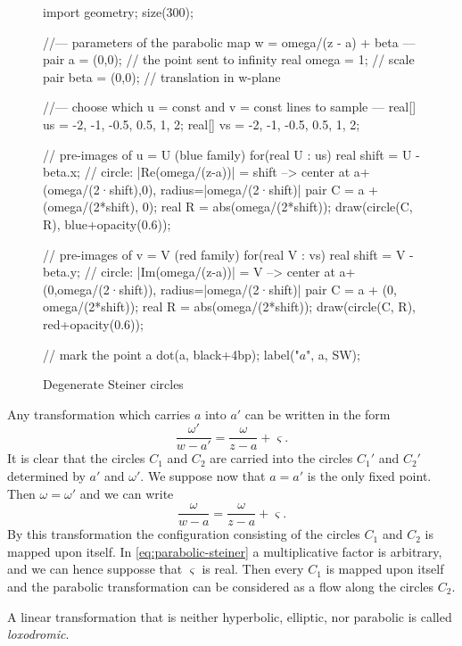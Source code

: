 \begin{figure}[h]
	\label{fig:degenerate-steiner}
	\caption{Degenerate Steiner circles}
	\centering
	\begin{asy}[width=10cm]
		import geometry;
		size(300);

		//--- parameters of the parabolic map w = omega/(z - a) + beta ---
		pair a    = (0,0);    // the point sent to infinity
		real omega = 1;       // scale
		pair beta = (0,0);    // translation in w-plane

		//--- choose which u = const and v = const lines to sample ---
		real[] us = {-2, -1, -0.5, 0.5, 1, 2};
		real[] vs = {-2, -1, -0.5, 0.5, 1, 2};

		// pre-images of u = U  (blue family)
		for(real U : us) {
		real shift = U - beta.x;
		// circle: |Re(omega/(z-a))| = shift  --> center at a+(omega/(2·shift),0), radius=|omega/(2·shift)|
		pair C = a + (omega/(2*shift), 0);
		real R = abs(omega/(2*shift));
		draw(circle(C, R), blue+opacity(0.6));
		}

		// pre-images of v = V  (red family)
		for(real V : vs) {
		real shift = V - beta.y;
		// circle: |Im(omega/(z-a))| = V  --> center at a+(0,omega/(2·shift)), radius=|omega/(2·shift)|
		pair C = a + (0, omega/(2*shift));
		real R = abs(omega/(2*shift));
		draw(circle(C, R), red+opacity(0.6));
		}

		// mark the point a
		dot(a, black+4bp);
		label("$a$", a, SW);
	\end{asy}
\end{figure}

Any transformation which carries $a$ into $a'$ can be written in the form $$\dfrac{\omega'}{w-a'}=\dfrac{\omega}{z-a}+\varsigma.$$ It is clear that the circles $C_1$ and $C_2$ are carried into the circles $C_1'$ and $C_2'$ determined by $a'$ and $\omega'$. We suppose now that $a=a'$ is the only fixed point. Then $\omega=\omega'$ and we can write
\begin{equation}
	\label{eq:parabolic-steiner}
	\dfrac{\omega}{w-a}=\dfrac{\omega}{z-a}+\varsigma.
\end{equation}
By this transformation the configuration consisting of the circles $C_1$ and $C_2$ is mapped upon itself. In \ref{eq:parabolic-steiner} a multiplicative factor is arbitrary, and we can hence supposse that $\varsigma$ is real. Then every $C_1$ is mapped upon itself and the parabolic transformation can be considered as a flow along the circles $C_2$.

A linear transformation that is neither hyperbolic, elliptic, nor parabolic is called \emph{loxodromic}.


